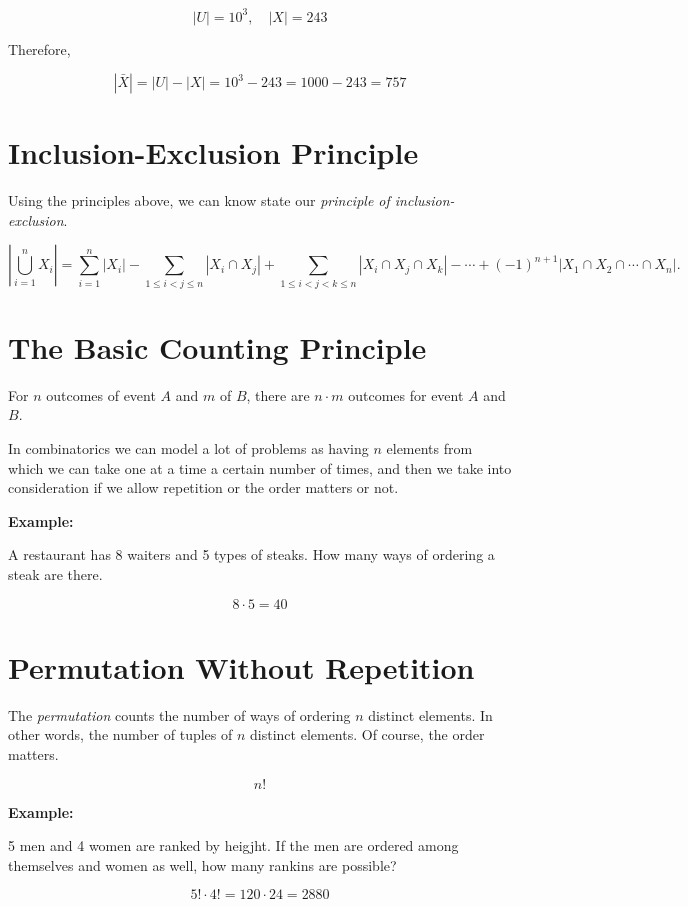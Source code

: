 \[
	|U| = 10^3, \quad |X| = 243
\]

Therefore,

\[
	|\bar{X}| = |U| - |X| = 10^3 - 243 = 1000 - 243 = 757
\]

\section{Inclusion-Exclusion Principle}

Using the principles above, we can know state our \emph{principle of inclusion-exclusion}.

\[
	\left| \bigcup_{i=1}^n X_i \right| = \sum_{i=1}^n |X_i| - \sum_{1 \le i < j \le n} |X_i \cap X_j| + \sum_{1 \le i < j < k \le n} |X_i \cap X_j \cap X_k| - \cdots + (-1)^{n+1} |X_1 \cap X_2 \cap \cdots \cap X_n|.
\]

\section{The Basic Counting Principle}

For \(n\) outcomes of event \(A\) and \(m\) of \(B\), there are \(n \cdot m\) outcomes for event \(A\) and \(B\).

In combinatorics we can model a lot of problems as having \(n\) elements from which we can take one at a time
a certain number of times, and then we take into consideration if we allow repetition or the order matters or not.

\textbf{Example:}

A restaurant has 8 waiters and 5 types of steaks. How many ways of ordering a steak are there.

\[
	8 \cdot 5 = 40
\]

\section{Permutation Without Repetition}

The \emph{permutation} counts the number of ways of ordering \(n\) distinct elements. In other words, the number of tuples of \(n\) distinct elements.
Of course, the order matters.

\[
	n!
\]

\textbf{Example:}

5 men and 4 women are ranked by heigjht. If the men are ordered among themselves and women as well, how many rankins are possible?

\[
	5! \cdot 4! = 120 \cdot 24 = 2880
\]

